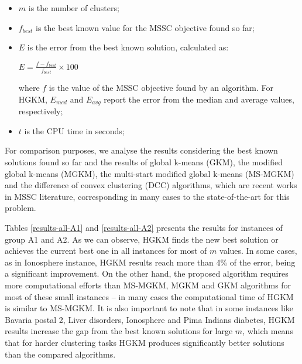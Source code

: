 \begin{itemize}

	\item $m$ is the number of clusters;

	\item $f_{best}$ is the best known value for the MSSC objective found so far;

	\item $E$ is the error from the best known solution, calculated as:

		\begin{center}
		\large
			$E = \frac{f - f_{best}}{f_{best}} \times 100$
		\end{center}
		
	where $f$ is the value of the MSSC objective found by an algorithm. For HGKM, $E_{med}$ and $E_{avg}$ report the error from the median and average values, respectively;
	
	\item $t$ is the CPU time in seconds;


\end{itemize}

For comparison purposes, we analyse the results considering the best known solutions found so far and the results of global k-means (GKM), the modified global k-means (MGKM), the multi-start modified global k-means (MS-MGKM) and the difference of convex clustering (DCC) algorithms, which are recent works in MSSC literature, corresponding in many cases to the state-of-the-art for this problem.

Tables \ref{results-all-A1} and \ref{results-all-A2} presents the results for instances of group A1 and A2. As we can observe, HGKM finds the new best solution or achieves the current best one in all instances for most of $m$ values. In some cases, as in Ionosphere instance, HGKM results reach more than 4\% of the error, being a significant improvement. On the other hand, the proposed algorithm requires more computational efforts than MS-MGKM, MGKM and GKM algorithms for most of these small instances -- in many cases the computational time of HGKM is similar to MS-MGKM. It is also important to note that in some instances like Bavaria postal 2, Liver disorders, Ionosphere and Pima Indians diabetes, HGKM results increase the gap from the best known solutions for large $m$, which means that for harder clustering tasks HGKM produces significantly better solutions than the compared algorithms.

